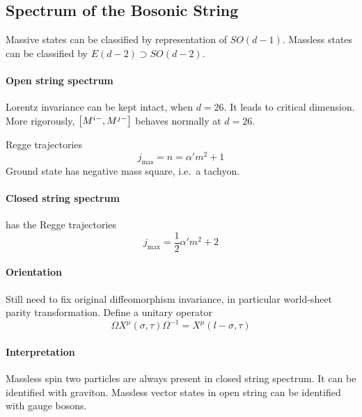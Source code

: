 \documentclass[12pt, a4paper, DIV=15]{article}
\numberwithin{equation}{section}
\begin{document}
\subsection{Spectrum of the Bosonic String}
Massive states can be classified by representation of $SO(d-1)$. Massless states can be classified by $E(d-2) \supset SO(d-2)$.
\paragraph{Open string spectrum}
Lorentz invariance can be kept intact, when $d=26$. It leads to critical dimension. More rigorously, $\comm{M^{i-}}{M^{j-}}$ behaves normally at $d=26$.

Regge trajectories
\begin{equation}
	j_\text{mas} = n = \alpha' m^2 + 1
\end{equation}
Ground state has negative mass square, i.e.~a tachyon.

\paragraph{Closed string spectrum} has the Regge trajectories
\begin{equation}
	j_\text{max} = \frac{1}{2} \alpha' m^2 + 2
\end{equation}

\paragraph{Orientation}
Still need to fix original diffeomorphism invariance, in particular world-sheet parity transformation. Define a unitary operator
\begin{equation}
	\Omega X^\mu(\sigma,\tau) \Omega^{-1} = X^\mu (l-\sigma,\tau)
\end{equation}

\paragraph{Interpretation}
Massless spin two particles are always present in closed string spectrum. It can be identified with graviton. Massless vector states in open string can be identified with gauge bosons.
\end{document}
